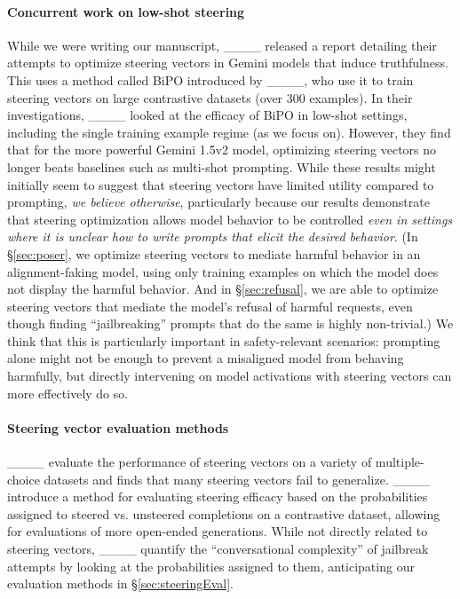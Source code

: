 \paragraph{Concurrent work on low-shot steering}
While we were writing our manuscript, ____ released a report detailing their attempts to optimize steering vectors in Gemini models that induce truthfulness. This uses a method called BiPO introduced by ____, who use it to train steering vectors on large contrastive datasets (over 300 examples). In their investigations, ____ looked at the efficacy of BiPO in low-shot settings, including the single training example regime (as we focus on). However, they find that for the more powerful Gemini 1.5v2 model, optimizing steering vectors no longer beats baselines such as multi-shot prompting. While these results might initially seem to suggest that steering vectors have limited utility compared to prompting, \textit{we believe otherwise}, particularly because our results demonstrate that steering optimization allows model behavior to be controlled \textit{even in settings where it is unclear how to write prompts that elicit the desired behavior}.
(In \S\ref{sec:poser}, we optimize steering vectors to mediate harmful behavior in an alignment-faking model, using only training examples on which the model does not display the harmful behavior. 
And in \S\ref{sec:refusal}, we are able to optimize steering vectors that mediate the model's refusal of harmful requests, even though finding \enquote{jailbreaking} prompts that do the same is highly non-trivial.)
We think that this is particularly important in safety-relevant scenarios: prompting alone might not be enough to prevent a misaligned model from behaving harmfully, but directly intervening on model activations with steering vectors can more effectively do so.

\paragraph{Steering vector evaluation methods} ____ evaluate the performance of steering vectors on a variety of multiple-choice datasets and finds that many steering vectors fail to generalize. ____ introduce a method for evaluating steering efficacy based on the probabilities assigned to steered vs. unsteered completions on a contrastive dataset, allowing for evaluations of more open-ended generations. While not directly related to steering vectors, ____ quantify the \enquote{conversational complexity} of jailbreak attempts by looking at the probabilities assigned to them, anticipating our evaluation methods in \S\ref{sec:steeringEval}.
